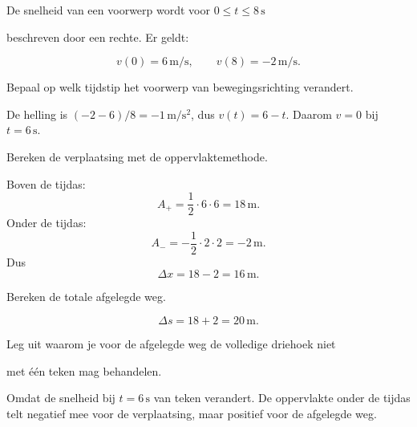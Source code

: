 \documentclass{ximera}
\begin{document}
\begin{oefening}{\oefU\ESS}

De snelheid van een voorwerp wordt voor $0\leq t\leq8\,\mathrm{s}$

beschreven door een rechte. Er geldt:

\[v(0)=6\,\mathrm{m/s}, \qquad v(8)=-2\,\mathrm{m/s}.\]

\begin{question}

Bepaal op welk tijdstip het voorwerp van bewegingsrichting verandert.

\begin{oplossing}
De helling is \((-2-6)/8=-1\,\mathrm{m/s^2}\), dus \(v(t)=6-t\). Daarom \(v=0\) bij \(t=6\,\mathrm{s}\).
\end{oplossing}

\end{question}

\begin{question}

Bereken de verplaatsing met de oppervlaktemethode.

\begin{oplossing}
Boven de tijdas:
\[A_+=\frac12\cdot6\cdot6=18\,\mathrm{m}.\]
Onder de tijdas:
\[A_-=-\frac12\cdot2\cdot2=-2\,\mathrm{m}.\]
Dus
\[\Delta x=18-2=16\,\mathrm{m}.\]
\end{oplossing}

\end{question}

\begin{question}

Bereken de totale afgelegde weg.

\begin{oplossing}
\[\Delta s=18+2=20\,\mathrm{m}.\]
\end{oplossing}

\end{question}

\begin{question}

Leg uit waarom je voor de afgelegde weg de volledige driehoek niet

met één teken mag behandelen.

\begin{oplossing}
Omdat de snelheid bij \(t=6\,\mathrm{s}\) van teken verandert. De oppervlakte onder de tijdas telt negatief mee voor de verplaatsing, maar positief voor de afgelegde weg.
\end{oplossing}

\end{question}

\end{oefening}
\end{document}
